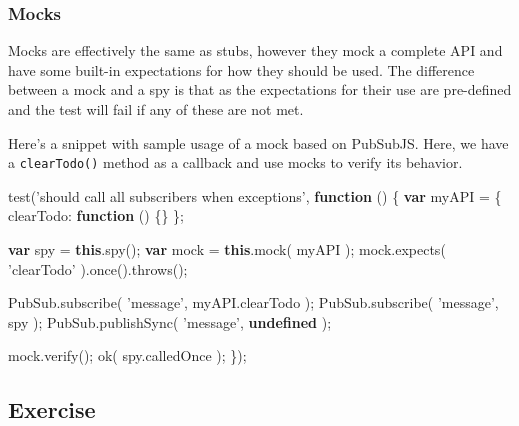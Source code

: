 \documentclass[9pt]{book}
\newenvironment{Shaded}{}{}
\newcommand{\KeywordTok}[1]{\textcolor[rgb]{0.00,0.44,0.13}{\textbf{{#1}}}}
\newcommand{\DataTypeTok}[1]{\textcolor[rgb]{0.56,0.13,0.00}{{#1}}}
\newcommand{\StringTok}[1]{\textcolor[rgb]{0.25,0.44,0.63}{{#1}}}
\newcommand{\OtherTok}[1]{\textcolor[rgb]{0.00,0.44,0.13}{{#1}}}
\newcommand{\FunctionTok}[1]{\textcolor[rgb]{0.02,0.16,0.49}{{#1}}}
\newcommand{\NormalTok}[1]{{#1}}
\begin{document}
\subsubsection{Mocks}\label{mocks}

Mocks are effectively the same as stubs, however they mock a complete
API and have some built-in expectations for how they should be used. The
difference between a mock and a spy is that as the expectations for
their use are pre-defined and the test will fail if any of these are not
met.

Here's a snippet with sample usage of a mock based on PubSubJS. Here, we
have a \texttt{clearTodo()} method as a callback and use mocks to verify
its behavior.

\begin{Shaded}
\begin{Highlighting}[]
\FunctionTok{test}\NormalTok{(}\StringTok{'should call all subscribers when exceptions'}\NormalTok{, }\KeywordTok{function} \NormalTok{() \{}
    \KeywordTok{var} \NormalTok{myAPI = \{ }\DataTypeTok{clearTodo}\NormalTok{: }\KeywordTok{function} \NormalTok{() \{\} \};}

    \KeywordTok{var} \NormalTok{spy = }\KeywordTok{this}\NormalTok{.}\FunctionTok{spy}\NormalTok{();}
    \KeywordTok{var} \NormalTok{mock = }\KeywordTok{this}\NormalTok{.}\FunctionTok{mock}\NormalTok{( myAPI );}
    \OtherTok{mock}\NormalTok{.}\FunctionTok{expects}\NormalTok{( }\StringTok{'clearTodo'} \NormalTok{).}\FunctionTok{once}\NormalTok{().}\FunctionTok{throws}\NormalTok{();}

    \OtherTok{PubSub}\NormalTok{.}\FunctionTok{subscribe}\NormalTok{( }\StringTok{'message'}\NormalTok{, }\OtherTok{myAPI}\NormalTok{.}\FunctionTok{clearTodo} \NormalTok{);}
    \OtherTok{PubSub}\NormalTok{.}\FunctionTok{subscribe}\NormalTok{( }\StringTok{'message'}\NormalTok{, spy );}
    \OtherTok{PubSub}\NormalTok{.}\FunctionTok{publishSync}\NormalTok{( }\StringTok{'message'}\NormalTok{, }\KeywordTok{undefined} \NormalTok{);}

    \OtherTok{mock}\NormalTok{.}\FunctionTok{verify}\NormalTok{();}
    \FunctionTok{ok}\NormalTok{( }\OtherTok{spy}\NormalTok{.}\FunctionTok{calledOnce} \NormalTok{);}
\NormalTok{\});}
\end{Highlighting}
\end{Shaded}

\subsection{Exercise}\label{exercise-1}
\end{document}
